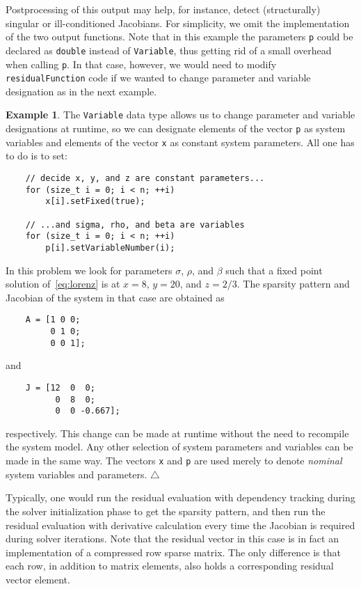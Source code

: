 \documentclass[10pt]{ijnam}
\theoremstyle{definition}
\newtheorem{example}{Example}[section]
\newcommand\xqed[1]{\leavevmode\unskip\penalty9999 \hbox{}\nobreak\hfill \quad\hbox{#1}}
\newcommand{\exampleSymbol}{\xqed{$\triangle$}}
\begin{document}
Postprocessing of this output may help, for instance, detect (structurally) singular or 
ill-conditioned Jacobians. For simplicity, we omit the implementation of the two output functions.
Note that in this example the parameters \texttt{p} could be declared as \texttt{double} instead 
of \texttt{Variable}, thus getting rid of a small overhead when calling \texttt{p}. In that case, 
however, we would need to modify \texttt{residualFunction} code if we wanted to change 
parameter and variable designation as in the next example.

\begin{example}
The \texttt{Variable} data type allows us to change parameter and variable designations at 
runtime, so we can designate elements of the vector \texttt{p} as system variables and elements 
of the vector \texttt{x} as constant system parameters. All one has to do is to set:
\begin{lstlisting}
    // decide x, y, and z are constant parameters... 
    for (size_t i = 0; i < n; ++i)
        x[i].setFixed(true);
        
    // ...and sigma, rho, and beta are variables    
    for (size_t i = 0; i < n; ++i)
        p[i].setVariableNumber(i);
\end{lstlisting}
In this problem we look for parameters $ \sigma $, $ \rho $, and $ \beta $ such that a fixed point solution of~\eqref{eq:lorenz} is at $ x = 8 $, $ y = 20 $, and $ z = 2/3 $. The sparsity pattern and Jacobian of the system in that case are obtained as
\begin{lstlisting}
    A = [1 0 0;
         0 1 0;
         0 0 1];
\end{lstlisting}
and
\begin{lstlisting}
    J = [12  0  0;
          0  8  0;
          0  0 -0.667];
\end{lstlisting}
respectively. This change can be made at runtime without the need to recompile the system model. Any other selection of system parameters and variables can be made in the same way. The vectors \texttt{x} and \texttt{p} are used merely to denote \textit{nominal} system variables and parameters.
\exampleSymbol
\end{example}

Typically, one would run the residual evaluation with dependency tracking during the solver initialization phase
to get the sparsity pattern, and then run the residual evaluation with derivative calculation every time the
Jacobian is required during solver iterations. Note that the residual vector
in this case is in fact an implementation 
of a compressed row sparse matrix. The only difference is that each row, 
in addition to matrix elements, also holds a corresponding residual vector 
element.
\end{document}
